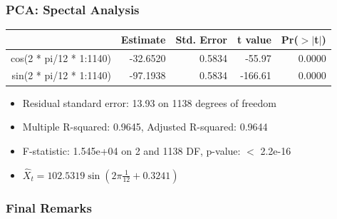 \documentclass{beamer}
\begin{document}
\begin{frame}
\frametitle{PCA: Spectal Analysis}
\begin{table}[ht]
	\centering
	\begin{tabular}{rrrrr}
		\hline
		& Estimate & Std. Error & t value & Pr($>$$|$t$|$) \\ 
		\hline
		cos(2 * pi/12 * 1:1140) & -32.6520 & 0.5834 & -55.97 & 0.0000 \\ 
		sin(2 * pi/12 * 1:1140) & -97.1938 & 0.5834 & -166.61 & 0.0000 \\ 
		\hline
	\end{tabular}
\end{table}
\begin{itemize}
	\item Residual standard error: 13.93 on 1138 degrees of freedom
	\item Multiple R-squared:  0.9645,	Adjusted R-squared:  0.9644 
	\item F-statistic: 1.545e+04 on 2 and 1138 DF,  p-value: $<$ 2.2e-16
	\item $\hat{X}_t = 102.5319\sin(2\pi\frac{1}{12} + 0.3241)$
\end{itemize}
\end{frame}

\begin{frame}
\frametitle{Final Remarks}
\end{frame}
\end{document}
